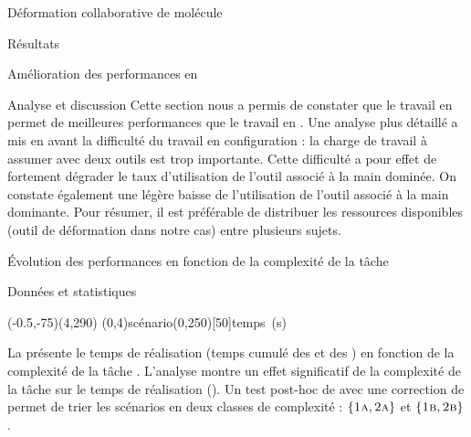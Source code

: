 \documentclass[myfrancais,ngerman,english,french]{mythesis}
\begin{document}
\begin{mychapter}{Déformation collaborative de molécule}
\begin{mysection}{Résultats}
\begin{mysubsection}{Amélioration des performances en }
\begin{mysubsubsection}{Analyse et discussion}
					Cette section nous a permis de constater que le travail en  permet de meilleures performances que le travail en .
					Une analyse plus détaillé a mis en avant la difficulté du travail en configuration  : la charge de travail à assumer avec deux outils est trop importante.
					Cette difficulté a pour effet de fortement dégrader le taux d'utilisation de l'outil associé à la main dominée.
					On constate également une légère baisse de l'utilisation de l'outil associé à la main dominante.
					Pour résumer, il est préférable de distribuer les ressources disponibles (outil de déformation dans notre cas) entre plusieurs sujets.
				\end{mysubsubsection}
			\end{mysubsection}
			\begin{mysubsection}{Évolution des performances en fonction de la complexité de la tâche}
				\begin{mysubsubsection}{Données et statistiques}
					\begin{myfigure}
						\begin{myps}(-0.5,-75)(4,290)
							\myaxes(0,4){scénario}(0,250)[50]{temps~(s)}
						\end{myps}
					\end{myfigure}

					La  présente le temps de réalisation  (temps cumulé des  et des ) en fonction de la complexité de la tâche .
					L'analyse montre un effet significatif de la complexité de la tâche  sur le temps de réalisation  ().
					Un test post-hoc de  avec une correction de  permet de trier les scénarios en deux classes de complexité : $\left\{\textsc{1a}, \textsc{2a}\right\}$ et $\left\{\textsc{1b}, \textsc{2b}\right\}$.


\end{mysubsubsection}
\end{mysubsection}
\end{mysection}
\end{mychapter}
\end{document}
